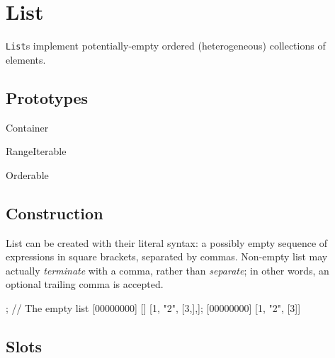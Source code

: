 
\section{List}

\lstinline|List|s implement potentially-empty ordered (heterogeneous)
collections of elements.

\subsection{Prototypes}

\begin{refObjects}
\item[Container]
\item[RangeIterable]
\item[Orderable]
\end{refObjects}

\subsection{Construction}

List can be created with their literal syntax: a possibly empty
sequence of expressions in square brackets, separated by commas.
Non-empty list may actually \emph{terminate} with a comma, rather than
\emph{separate}; in other words, an optional trailing comma is accepted.

\begin{urbiscript}[firstnumber=1]
[]; // The empty list
[00000000] []
[1, "2", [3,],];
[00000000] [1, "2", [3]]
\end{urbiscript}

\subsection{Slots}

